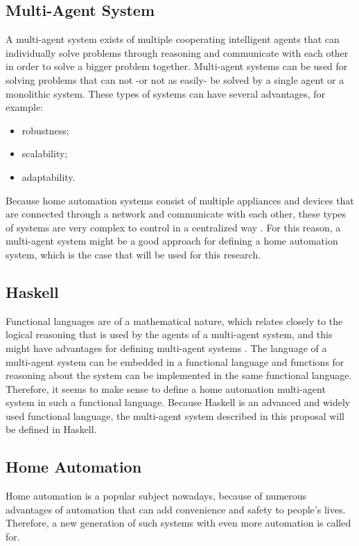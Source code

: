 \documentclass{sig-alternate-br}
\begin{document}
\subsection{Multi-Agent System}
A multi-agent system exists of multiple cooperating intelligent agents that can individually solve problems through reasoning and communicate with each other in order to solve a bigger problem together. Multi-agent systems can be used for solving problems that can not -or not as easily- be solved by a single agent or a monolithic system. These types of systems can have several advantages, for example:
\begin{itemize}
\item robustness;
\item scalability;
\item adaptability.
\end{itemize}
Because home automation systems consist of multiple appliances and devices that are connected through a network and communicate with each other, these types of systems are very complex to control in a centralized way \cite{mast}. For this reason, a multi-agent system might be a good approach for defining a home automation system, which is the case that will be used for this research.

\subsection{Haskell}
Functional languages are of a mathematical nature, which relates closely to the logical reasoning that is used by the agents of a multi-agent system, and this might have advantages for defining multi-agent systems \cite{dif}. The language of a multi-agent system can be embedded in a functional language and functions for reasoning about the system can be implemented in the same functional language. Therefore, it seems to make sense to define a home automation multi-agent system in such a functional language. Because Haskell is an advanced and widely used functional language, the multi-agent system described in this proposal will be defined in Haskell. 

\subsection{Home Automation}
Home automation is a popular subject nowadays, because of numerous advantages of automation that can add convenience and safety to people's lives. Therefore, a new generation of such systems with even more automation is called for.
\end{document}
